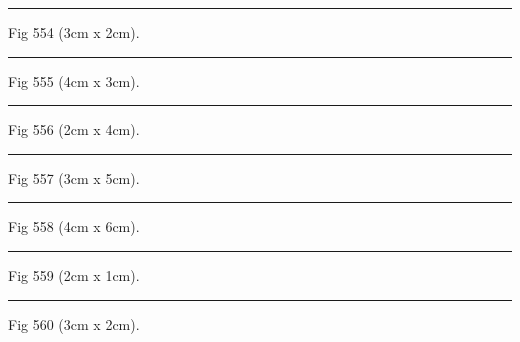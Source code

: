 \documentclass[a4paper,11pt]{article}
\begin{document}
\begin{swarmwrap}%
  \begin{minipage}[t]{3cm}
    \centering
    \rule{\linewidth}{2cm}
    {\footnotesize Fig 554 (3cm x 2cm).}
  \end{minipage}%
\end{swarmwrap}%
\swarmwrapnext
\lipsum[104]%

\begin{swarmwrap}%
  \begin{minipage}[t]{4cm}
    \centering
    \rule{\linewidth}{3cm}
    {\footnotesize Fig 555 (4cm x 3cm).}
  \end{minipage}%
\end{swarmwrap}%
\swarmwrapnext
\lipsum[105]%

\begin{swarmwrap}%
  \begin{minipage}[t]{2cm}
    \centering
    \rule{\linewidth}{4cm}
    {\footnotesize Fig 556 (2cm x 4cm).}
  \end{minipage}%
\end{swarmwrap}%
\swarmwrapnext
\lipsum[106]%

\begin{swarmwrap}%
  \begin{minipage}[t]{3cm}
    \centering
    \rule{\linewidth}{5cm}
    {\footnotesize Fig 557 (3cm x 5cm).}
  \end{minipage}%
\end{swarmwrap}%
\swarmwrapnext
\lipsum[107]%

\begin{swarmwrap}%
  \begin{minipage}[t]{4cm}
    \centering
    \rule{\linewidth}{6cm}
    {\footnotesize Fig 558 (4cm x 6cm).}
  \end{minipage}%
\end{swarmwrap}%
\swarmwrapnext
\lipsum[108]%

\begin{swarmwrap}%
  \begin{minipage}[t]{2cm}
    \centering
    \rule{\linewidth}{1cm}
    {\footnotesize Fig 559 (2cm x 1cm).}
  \end{minipage}%
\end{swarmwrap}%
\swarmwrapnext
\lipsum[109]%

\begin{swarmwrap}%
  \begin{minipage}[t]{3cm}
    \centering
    \rule{\linewidth}{2cm}
    {\footnotesize Fig 560 (3cm x 2cm).}
  \end{minipage}%
\end{swarmwrap}%
\swarmwrapnext
\lipsum[110]%
\end{document}
